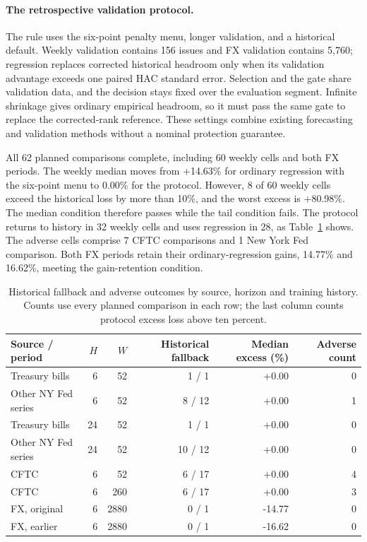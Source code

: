 \FloatBarrier
\paragraph{The retrospective validation protocol.}
The rule uses the six-point penalty menu, longer validation, and a historical default. Weekly validation contains 156 issues and FX validation contains 5,760; regression replaces corrected historical headroom only when its validation advantage exceeds one paired HAC standard error. Selection and the gate share validation data, and the decision stays fixed over the evaluation segment. Infinite shrinkage gives ordinary empirical headroom, so it must pass the same gate to replace the corrected-rank reference. These settings combine existing forecasting and validation methods without a nominal protection guarantee.

All 62 planned comparisons complete, including 60 weekly cells and both FX periods. The weekly median moves from +14.63\% for ordinary regression with the six-point menu to 0.00\% for the protocol. However, 8 of 60 weekly cells exceed the historical loss by more than 10\%, and the worst excess is +80.98\%. The median condition therefore passes while the tail condition fails. The protocol returns to history in 32 weekly cells and uses regression in 28, as Table~\ref{tab:v13-routing} shows. The adverse cells comprise 7 CFTC comparisons and 1 New York Fed comparison. Both FX periods retain their ordinary-regression gains, 14.77\% and 16.62\%, meeting the gain-retention condition.

\begin{table}[!htbp]\centering\footnotesize\setlength{\tabcolsep}{4pt}
\caption{Historical fallback and adverse outcomes by source, horizon and training history. Counts use every planned comparison in each row; the last column counts protocol excess loss above ten percent.}\label{tab:v13-routing}
\begin{tabular}{lrrr rr}\toprule
Source / period & $H$ & $W$ & Historical fallback & Median excess (\%) & Adverse count\\\midrule
Treasury bills & 6 & 52 & 1 / 1 & +0.00 & 0 \\
Other NY Fed series & 6 & 52 & 8 / 12 & +0.00 & 1 \\
Treasury bills & 24 & 52 & 1 / 1 & +0.00 & 0 \\
Other NY Fed series & 24 & 52 & 10 / 12 & +0.00 & 0 \\
CFTC & 6 & 52 & 6 / 17 & +0.00 & 4 \\
CFTC & 6 & 260 & 6 / 17 & +0.00 & 3 \\
FX, original & 6 & 2880 & 0 / 1 & -14.77 & 0 \\
FX, earlier & 6 & 2880 & 0 / 1 & -16.62 & 0 \\
\bottomrule\end{tabular}
\end{table}

